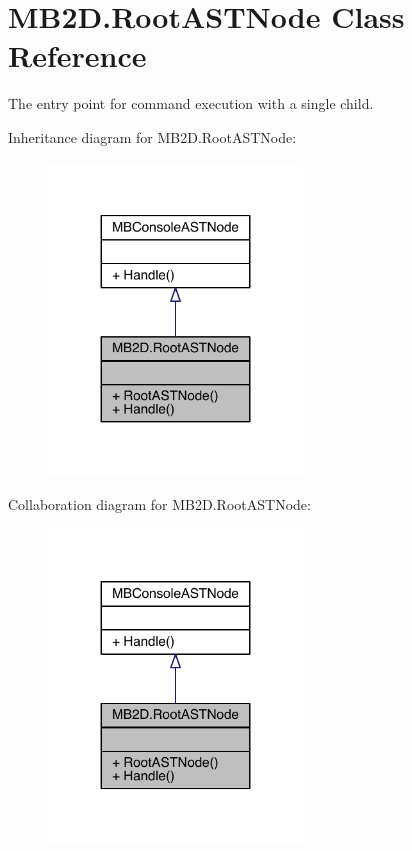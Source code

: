 \hypertarget{class_m_b2_d_1_1_root_a_s_t_node}{}\section{M\+B2\+D.\+Root\+A\+S\+T\+Node Class Reference}
\label{class_m_b2_d_1_1_root_a_s_t_node}


The entry point for command execution with a single child.  




Inheritance diagram for M\+B2\+D.\+Root\+A\+S\+T\+Node\+:\nopagebreak
\begin{figure}[H]
\begin{center}
\leavevmode
\includegraphics[width=191pt]{class_m_b2_d_1_1_root_a_s_t_node__inherit__graph}
\end{center}
\end{figure}


Collaboration diagram for M\+B2\+D.\+Root\+A\+S\+T\+Node\+:\nopagebreak
\begin{figure}[H]
\begin{center}
\leavevmode
\includegraphics[width=191pt]{class_m_b2_d_1_1_root_a_s_t_node__coll__graph}
\end{center}
\end{figure}

